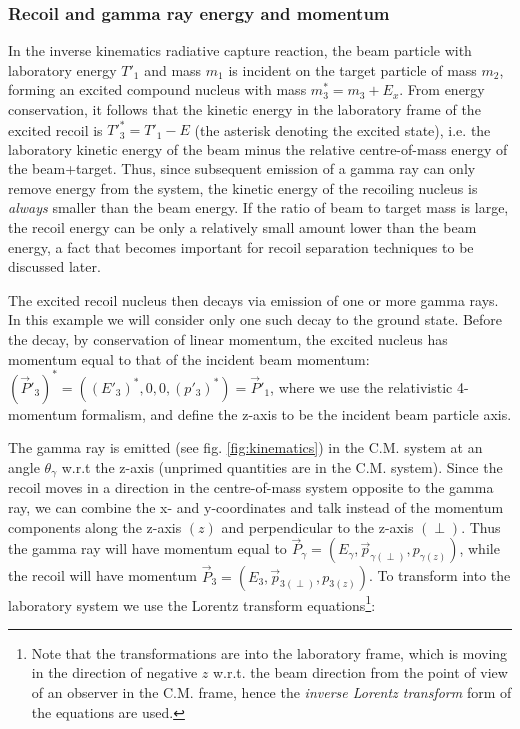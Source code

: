 \subsubsection{Recoil and gamma ray energy and momentum}

In the inverse kinematics radiative capture reaction, the beam particle with laboratory energy $T'_{1}$ and mass $m_{1}$ is incident on the target particle of mass $m_{2}$, forming an excited compound nucleus with mass $m^{*}_{3}=m_{3}+E_{x}$. From energy conservation, it follows that the kinetic energy in the laboratory frame of the excited recoil is $T'^{*}_{3}=T'_{1}-E$ (the asterisk denoting the excited state), i.e. the laboratory kinetic energy of the beam minus the relative centre-of-mass energy of the beam+target. Thus, since subsequent emission of a gamma ray can only remove energy from the system, the kinetic energy of the recoiling nucleus is {\em always} smaller than the beam energy. If the ratio of beam to target mass is large, the recoil energy can be only a relatively small amount lower than the beam energy, a fact that becomes important for recoil separation techniques to be discussed later. 

The excited recoil nucleus then decays via emission of one or more gamma rays. In this example we will consider only one such decay to the ground state. Before the decay, by conservation of linear momentum, the excited nucleus has momentum  equal to that of the incident beam momentum: $(\vec{P}'_{3})^{*}=((E'_{3})^{*},0,0,(p'_{3})^{*})=\vec{P}'_{1}$, where we use the relativistic 4-momentum formalism, and define the z-axis to be the incident beam particle axis.  

The gamma ray is emitted (see fig. \ref{fig:kinematics}) in the C.M. system at an angle $\theta_{\gamma}$ w.r.t the z-axis (unprimed quantities are in the C.M. system). Since the recoil moves in a direction in the centre-of-mass system opposite to the gamma ray, we can combine the x- and y-coordinates and talk instead of the momentum components along the z-axis $(z)$ and perpendicular to the z-axis $(\perp)$. Thus the gamma ray will have momentum equal to $\vec{P}_{\gamma}=(E_\gamma, \vec{p}_{\gamma \left( \perp \right)}, p_{\gamma \left( z \right)})$,  while the recoil will have momentum  $\vec{P}_{3}=(E_{3},\vec{p}_{3 \left( \perp \right)},p_{3 \left( z \right)})$. To transform into the laboratory system we use the Lorentz transform equations\footnote{Note that the transformations are into the laboratory frame, which is moving in the direction of negative $z$ w.r.t. the beam direction from the point of view of an observer in the C.M. frame, hence the {\em inverse Lorentz transform} form of the equations are used.}:  

